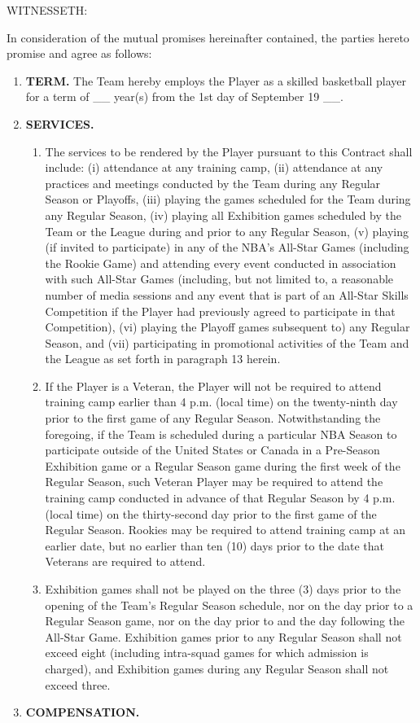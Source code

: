 \documentclass[
]{book}
\providecommand{\tightlist}{%
  \setlength{\itemsep}{0pt}\setlength{\parskip}{0pt}}
\begin{document}
WITNESSETH:

In consideration of the mutual promises hereinafter contained, the parties hereto promise and agree as follows:

\begin{enumerate}
\def\labelenumi{\arabic{enumi}.}
\tightlist
\item
  \textbf{TERM.} The Team hereby employs the Player as a skilled basketball player for a term of \_\_ year(s) from the 1st day of September 19 \_\_.
\item
  \textbf{SERVICES.}

  \begin{enumerate}
  \def\labelenumii{(\alph{enumii})}
  \tightlist
  \item
    The services to be rendered by the Player pursuant to this Contract shall include: (i) attendance at any training camp, (ii) attendance at any practices and meetings conducted by the Team during any Regular Season or Playoffs, (iii) playing the games scheduled for the Team during any Regular Season, (iv) playing all Exhibition games scheduled by the Team or the League during and prior to any Regular Season, (v) playing (if invited to participate) in any of the NBA's All-Star Games (including the Rookie Game) and attending every event conducted in association with such All-Star Games (including, but not limited to, a reasonable number of media sessions and any event that is part of an All-Star Skills Competition if the Player had previously agreed to participate in that Competition), (vi) playing the Playoff games subsequent to) any Regular Season, and (vii) participating in promotional activities of the Team and the League as set forth in paragraph 13 herein.
  \item
    If the Player is a Veteran, the Player will not be required to attend training camp earlier than 4 p.m. (local time) on the twenty-ninth day prior to the first game of any Regular Season. Notwithstanding the foregoing, if the Team is scheduled during a particular NBA Season to participate outside of the United States or Canada in a Pre-Season Exhibition game or a Regular Season game during the first week of the Regular Season, such Veteran Player may be required to attend the training camp conducted in advance of that Regular Season by 4 p.m. (local time) on the thirty-second day prior to the first game of the Regular Season. Rookies may be required to attend training camp at an earlier date, but no earlier than ten (10) days prior to the date that Veterans are required to attend.
  \item
    Exhibition games shall not be played on the three (3) days prior to the opening of the Team's Regular Season schedule, nor on the day prior to a Regular Season game, nor on the day prior to and the day following the All-Star Game. Exhibition games prior to any Regular Season shall not exceed eight (including intra-squad games for which admission is charged), and Exhibition games during any Regular Season shall not exceed three.
  \end{enumerate}
\item
  \textbf{COMPENSATION.}


\end{enumerate}
\end{document}
